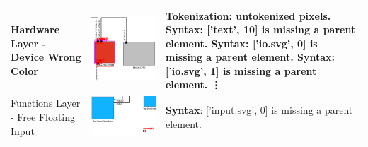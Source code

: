 \begin{longtable}{p{} >{\raggedright\arraybackslash}m{} >{\raggedright\arraybackslash}m{}}
    Hardware Layer - Device Wrong Color &  \includegraphics[width=\linewidth]{pictures/32_wrong_color_task_output_clip.png} & \textbf{Tokenization}: untokenized pixels. \newline
        \textbf{Syntax}: ['text', 10] is missing a parent element. \newline
        \textbf{Syntax}: ['io.svg', 0] is missing a parent element. \newline
        \textbf{Syntax}: ['io.svg', 1] is missing a parent element. \newline
        \vdots \\
    \midrule
    Functions Layer - Free Floating Input & \includegraphics[width=\linewidth]{pictures/40_free_floating_input_output_clip.png} & \textbf{Syntax}: ['input.svg', 0] is missing a parent element. \newline

\end{longtable}
